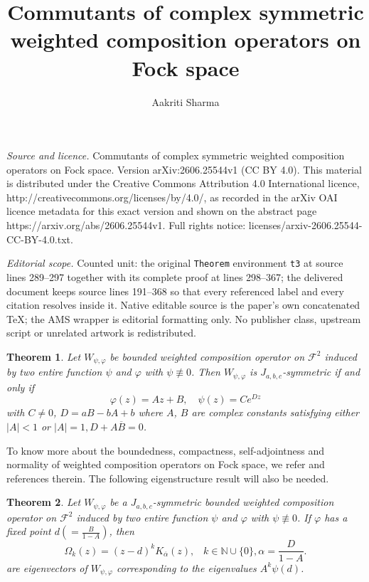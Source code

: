 \documentclass[10pt,a4paper]{amsart}
\newtheorem{Theorem}{Theorem}
\numberwithin{equation}{section}
\begin{document}
\title[Commutants of complex symmetric weighted composition operato]{Commutants of complex symmetric weighted composition operators on Fock space}
\author{Aakriti Sharma}
\date{}
\maketitle
\noindent\emph{Source and licence.} Commutants of complex symmetric weighted composition operators on Fock space. Version arXiv:2606.25544v1 (CC BY 4.0). This material is distributed under the Creative Commons Attribution 4.0 International licence, http://creativecommons.org/licenses/by/4.0/, as recorded in the arXiv OAI licence metadata for this exact version and shown on the abstract page https://arxiv.org/abs/2606.25544v1. Full rights notice: licenses/arxiv-2606.25544-CC-BY-4.0.txt.\par\smallskip
\noindent\textit{Editorial scope.} Counted unit: the original \texttt{Theorem} environment \texttt{t3} at source lines 289--297 together with its complete proof at lines 298--367; the delivered document keeps source lines 191--368 so that every referenced label and every citation resolves inside it. Native editable source is the paper's own concatenated TeX; the AMS wrapper is editorial formatting only. No publisher class, upstream script or unrelated artwork is redistributed.
\begin{Theorem}\cite{PVL}\label{t1}
  Let $W_{\psi, \varphi}$ be bounded weighted composition operator on $\mathcal{F}^{2}$ induced by two entire function $\psi$ and $\varphi$ with $\psi\not\equiv 0 $. Then  $W_{\psi, \varphi}$ is $J_{a,b,c}$-symmetric  if and only if
  $$\varphi(z)= Az+B,\quad \psi(z)=Ce^{Dz}$$ 
  with $C\neq 0$, $D=aB-bA+b$ where $A$, $B$ are complex constants satisfying either $|A|< 1$
  or $|A|=1, D+A\overline{B}=0$.
\end{Theorem}
To know more about the boundedness, compactness, self-adjointness and normality of weighted composition operators on Fock space, we refer \cite{TL1}and references therein.
The following eigenstructure result will also be needed.
\begin{Theorem}\cite{PVL}\label{t2}Let $W_{\psi, \varphi}$ be a $J_{a,b,c}$-symmetric bounded weighted composition operator on $\mathcal{F}^{2}$ induced by two entire function $\psi$ and $\varphi$ with $\psi\not\equiv 0 $. If $\varphi$ has a fixed point $d(=\frac{B}{1-A})$, then 
$$\Omega_{k}(z)= (z-d)^{k}K_{\overline{\alpha}}(z),\;\;\; k\in \mathbb{N}\cup \{0\}, \alpha=\frac{D}{1-A}.  $$
are eigenvectors of $W_{\psi, \varphi}$ corresponding to the eigenvalues $A^{k}\psi(d)$.
\end{Theorem}
\end{document}
